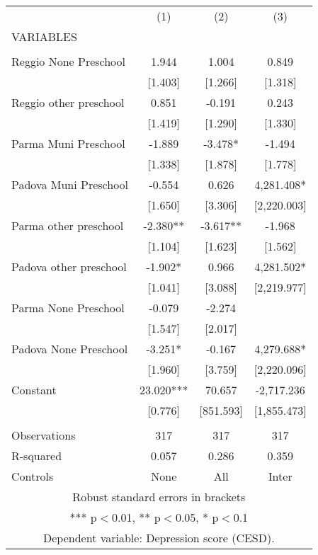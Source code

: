 \begin{tabular}{lccc} \hline
 & (1) & (2) & (3) \\
VARIABLES &  &  &  \\ \hline
 &  &  &  \\
Reggio None Preschool & 1.944 & 1.004 & 0.849 \\
 & [1.403] & [1.266] & [1.318] \\
Reggio other preschool & 0.851 & -0.191 & 0.243 \\
 & [1.419] & [1.290] & [1.330] \\
Parma Muni Preschool & -1.889 & -3.478* & -1.494 \\
 & [1.338] & [1.878] & [1.778] \\
Padova Muni Preschool & -0.554 & 0.626 & 4,281.408* \\
 & [1.650] & [3.306] & [2,220.003] \\
Parma other preschool & -2.380** & -3.617** & -1.968 \\
 & [1.104] & [1.623] & [1.562] \\
Padova other preschool & -1.902* & 0.966 & 4,281.502* \\
 & [1.041] & [3.088] & [2,219.977] \\
Parma None Preschool & -0.079 & -2.274 &  \\
 & [1.547] & [2.017] &  \\
Padova None Preschool & -3.251* & -0.167 & 4,279.688* \\
 & [1.960] & [3.759] & [2,220.096] \\
Constant & 23.020*** & 70.657 & -2,717.236 \\
 & [0.776] & [851.593] & [1,855.473] \\
 &  &  &  \\
Observations & 317 & 317 & 317 \\
R-squared & 0.057 & 0.286 & 0.359 \\
 Controls & None & All & Inter \\ \hline
\multicolumn{4}{c}{ Robust standard errors in brackets} \\
\multicolumn{4}{c}{ *** p$<$0.01, ** p$<$0.05, * p$<$0.1} \\
\multicolumn{4}{c}{ Dependent variable: Depression score (CESD).} \\
\end{tabular}
